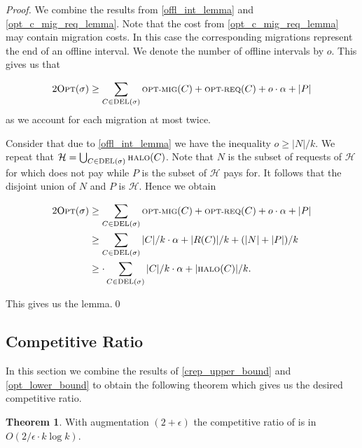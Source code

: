 \documentclass[a4paper, 10pt]{article}
\newcommand{\crep}{\text{C{\scriptsize REP}}}
\newcommand{\optmig}{\text{\scriptsize OPT-MIG}}
\newcommand{\optreq}{\text{\scriptsize OPT-REQ}}
\newcommand{\del}{\text{\scriptsize DEL}}
\newcommand{\opt}{\text{O{\scriptsize PT}}}
\newcommand{\halo}{\text{\scriptsize HALO}}
\theoremstyle{definition}
\newtheorem{theo}[defi]{Theorem}
\begin{document}
\textit{Proof.} We combine the results from \cref{offl_int_lemma} and \cref{opt_c_mig_req_lemma}. Note that the cost from \cref{opt_c_mig_req_lemma} may contain migration costs. In this case the corresponding migrations represent the end of an offline interval. We denote the number of offline intervals by $o$. This gives us that

\begin{align*}
2\opt{}(\sigma)\geq\sum_{C\in\del(\sigma)}\optmig(C)+\optreq(C)+ o\cdot\alpha+|P|
\end{align*}
as we account for each migration at most twice.

Consider that due to \cref{offl_int_lemma} we have the inequality $o\geq|N|/k$. We repeat that $\mathcal{H}=\bigcup_{C\in\del{}(\sigma)}\halo{}(C)$. Note that $N$ is the subset of requests of $\mathcal{H}$ for which \opt{} does not pay while $P$ is the subset of $\mathcal{H}$ \opt{} pays for. It follows that the disjoint union of $N$ and $P$ is $\mathcal{H}$. Hence we obtain

\begin{align*}
2\opt{}(\sigma)&\geq\sum_{C\in\del(\sigma)}\optmig(C)+\optreq(C)+ o\cdot\alpha+|P|\\
&\geq\sum_{C\in\del(\sigma)}|C|/k\cdot\alpha+|R(C)|/k+(|N|+|P|)/k\\
&\geq \cdot\sum_{C\in\del{}(\sigma)}|C|/k\cdot\alpha+|\halo(C)|/k.
\end{align*}

This gives us the lemma.\qed

\subsection{Competitive Ratio}
In this section we combine the results of \cref{crep_upper_bound} and \cref{opt_lower_bound} to obtain the following theorem which gives us the desired competitive ratio.

\begin{theo}
	\label{comp_ratio_theo}
	With augmentation $(2+\epsilon)$ the competitive ratio of \crep{} is in $O(2/\epsilon\cdot k \log k)$.
\end{theo}
\end{document}
